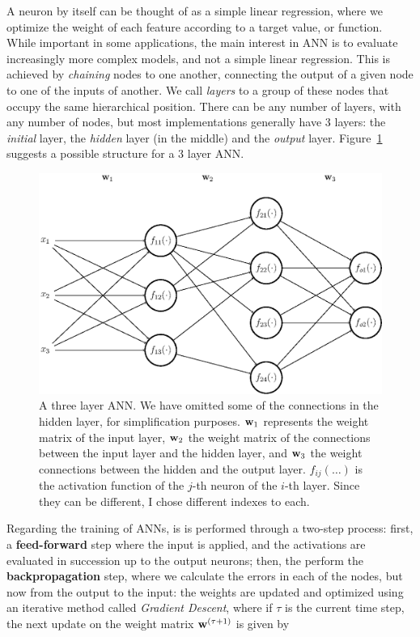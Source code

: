 A neuron by itself can be thought of as a simple linear regression, where we optimize the weight of each feature according to a target value, or function. While important in some applications, the main interest in ANN is to evaluate increasingly more complex models, and not a simple linear regression. This is achieved by \emph{chaining} nodes to one another, connecting the output of a given node to one of the inputs of another. We call \emph{layers} to a group of these nodes that occupy the same hierarchical position. There can be any number of layers, with any number of nodes, but most implementations generally have 3 layers: the \emph{initial} layer, the \emph{hidden} layer (in the middle) and the \emph{output} layer. Figure~\ref{fig:neuralnet} suggests a possible structure for a 3 layer ANN. 


\begin{figure}[H]
	\centering
	\includegraphics[width=0.9\linewidth]{figures/ann.eps}
	\caption{A three layer ANN. We have omitted some of the connections in the hidden layer, for simplification purposes. $\mathbf{w}_1$ represents the weight matrix of the input layer, $\mathbf{w}_2$ the weight matrix of the connections between the input layer and the hidden layer, and $\mathbf{w}_3$ the weight connections between the hidden and the output layer. $f_{ij}(\dots)$ is the activation function of the $j$-th neuron of the $i$-th layer. Since they can be different, I chose different indexes to each.}
	\label{fig:neuralnet}
\end{figure}

Regarding the training of ANNs, is is performed through a two-step process: first, a \textbf{feed-forward} step where the input is applied, and the activations are evaluated in succession up to the output neurons; then, the perform the \textbf{backpropagation} step, where we calculate the errors in each of the nodes, but now from the output to the input: the weights are updated and optimized using an iterative  method called \textit{Gradient Descent}, where if $\tau$ is the current time step, the next update on the weight matrix $\mathbf{w}^{(\tau+1)}$ is given by

